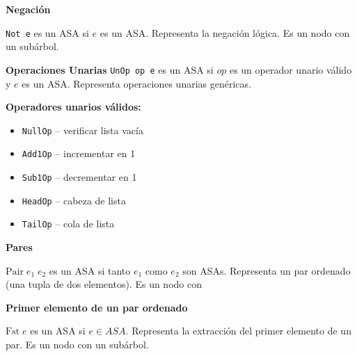 \documentclass[a4paper,12pt]{article}
\begin{document}
\begin{tcolorbox}[title=Correción:ASA de  LAMBDAE    MÓDULO A3, breakable]
\begin{prooftree}
\end{prooftree}

\textbf{Negación}

\texttt{Not\ e} es un ASA si \(e\) es un ASA. Representa la negaci\'on l\'ogica. Es un nodo con un sub\'arbol.\\


\begin{prooftree}
\end{prooftree}

\textbf{Operaciones Unarias}
\texttt{UnOp\ op\ e} es un ASA si \( op \) es un operador unario v\'alido y \( e \) es un ASA. Representa operaciones unarias gen\'ericas.

\textbf{Operadores unarios v\'alidos:}\\
\begin{itemize}
    \item \texttt{NullOp} -- verificar lista vac\'ia
    \item \texttt{Add1Op} -- incrementar en 1
    \item \texttt{Sub1Op} -- decrementar en 1
    \item \texttt{HeadOp} -- cabeza de lista
    \item \texttt{TailOp} -- cola de lista
\end{itemize}

\begin{prooftree}
\end{prooftree}

\textbf{Pares}

\(\mathrm{Pair}\; e_{1}\; e_{2}\) es un ASA si tanto \(e_{1}\) como \(e_{2}\) son ASAs. 
Representa un par ordenado (una tupla de dos elementos). Es un nodo con 

\begin{prooftree}
\end{prooftree}

\textbf{Primer elemento de un par ordenado}

\(\mathrm{Fst}\; e\) es un ASA si \(e \in ASA\). Representa la extracci\'on del primer elemento de un par. Es un nodo con un sub\'arbol.

\begin{prooftree}
\end{prooftree}


\end{tcolorbox}
\end{document}

